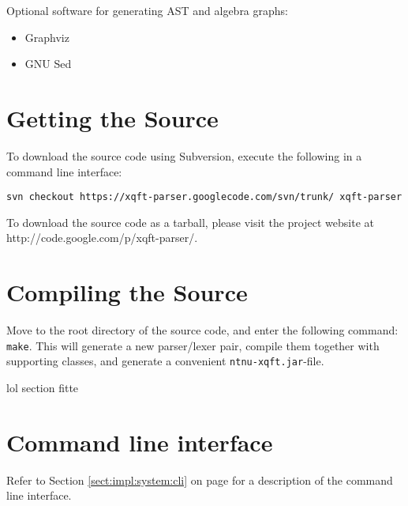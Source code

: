Optional software for generating AST and algebra graphs:
\begin{itemize}
  \item Graphviz
  \item GNU Sed
\end{itemize}

\section*{Getting the Source}
To download the source code using Subversion, execute the following in a
command line interface:

\verb!svn checkout https://xqft-parser.googlecode.com/svn/trunk/ xqft-parser!

To download the source code as a tarball, please visit the project website at
http://code.google.com/p/xqft-parser/.

\section*{Compiling the Source}
Move to the root directory of the source code, and enter the following command:
\verb!make!. This will generate a new parser/lexer pair, compile them together
with supporting classes, and generate a convenient \verb!ntnu-xqft.jar!-file.

lol section fitte

\section*{Command line interface}
Refer to Section \ref{sect:impl:system:cli} on page
\pageref{sect:impl:system:cli} for a description of the command line interface.
